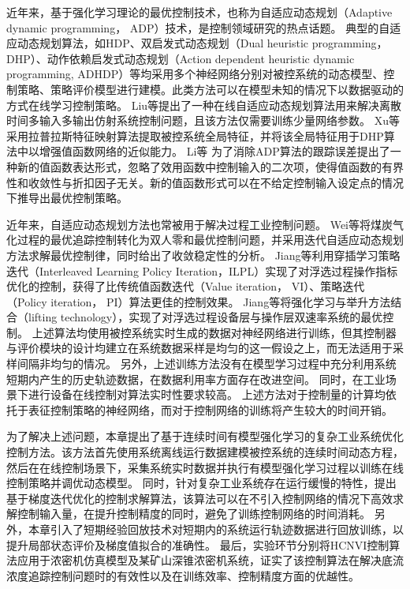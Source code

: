 近年来，基于强化学习\cite{Sutton2018}\cite{F.L.LewisD.Vrabie2012}理论的最优控制技术，也称为自适应动态规划（Adaptive dynamic programming， ADP）\cite{Prokhorov1997}\cite{Werbos2008}\cite{Duan:643}技术，是控制领域研究的热点话题。
典型的自适应动态规划算法，如HDP、双启发式动态规划（Dual heuristic
programming，DHP）、动作依赖启发式动态规划（Action dependent
heuristic dynamic programming,
ADHDP）\cite{Werbos2008}等均采用多个神经网络分别对被控系统的动态模型、控制策略、策略评价模型进行建模。此类方法可以在模型未知的情况下以数据驱动的方式在线学习控制策略。
Liu等\cite{Liu2015}提出了一种在线自适应动态规划算法用来解决离散时间多输入多输出仿射系统控制问题，且该方法仅需要训练少量网络参数。
Xu等\cite{XuX2017}采用拉普拉斯特征映射算法提取被控系统全局特征，并将该全局特征用于DHP算法中以增强值函数网络的近似能力。
Li等\cite{LI2021109687} 为了消除ADP算法的跟踪误差提出了一种新的值函数表达形式，忽略了效用函数中控制输入的二次项，使得值函数的有界性和收敛性与折扣因子无关。新的值函数形式可以在不给定控制输入设定点的情况下推导出最优控制策略。

近年来，自适应动态规划方法也常被用于解决过程工业控制问题。
Wei等\cite{Wei2014}将煤炭气化过程的最优追踪控制转化为双人零和最优控制问题，并采用迭代自适应动态规划方法求解最优控制律，同时给出了收敛稳定性的分析。
Jiang等\cite{Jiang2018}利用穿插学习策略迭代（Interleaved Learning
Policy Iteration，ILPL）实现了对浮选过程操作指标优化的控制，获得了比传统值函数迭代（Value iteration， VI）、策略迭代（Policy iteration， PI）算法更佳的控制效果。
Jiang等\cite{Jiang2019}将强化学习与举升方法结合（lifting technology），实现了对浮选过程设备层与操作层双速率系统的最优控制。
上述算法均使用被控系统实时生成的数据对神经网络进行训练，但其控制器与评价模块的设计均建立在系统数据采样是均匀的这一假设之上，而无法适用于采样间隔非均匀的情况。
另外，上述训练方法没有在模型学习过程中充分利用系统短期内产生的历史轨迹数据，在数据利用率方面存在改进空间。
同时，在工业场景下进行设备在线控制对算法实时性要求较高。
上述方法对于控制量的计算均依托于表征控制策略的神经网络，而对于控制网络的训练将产生较大的时间开销。

为了解决上述问题，本章提出了基于连续时间有模型强化学习的复杂工业系统优化控制方法。该方法首先使用系统离线运行数据建模被控系统的连续时间动态方程，
然后在在线控制场景下，采集系统实时数据并执行有模型强化学习过程以训练在线控制策略并调优动态模型。
同时，针对复杂工业系统存在运行缓慢的特性，提出基于梯度迭代优化的控制求解算法，该算法可以在不引入控制网络的情况下高效求解控制输入量，在提升控制精度的同时，避免了训练控制网络的时间消耗。
另外，本章引入了短期经验回放技术\cite{Modares2014}\cite{Mnih2013}对短期内的系统运行轨迹数据进行回放训练，以提升局部状态评价及梯度值拟合的准确性。
最后，实验环节分别将HCNVI控制算法应用于浓密机仿真模型及某矿山深锥浓密机系统，证实了该控制算法在解决底流浓度追踪控制问题时的有效性以及在训练效率、控制精度方面的优越性。




